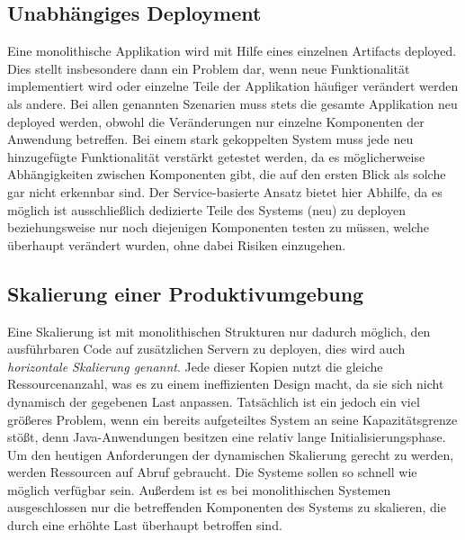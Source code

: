 \subsection{Unabhängiges Deployment}
Eine monolithische Applikation wird mit Hilfe eines einzelnen Artifacts deployed. Dies stellt insbesondere dann ein Problem dar, wenn neue Funktionalität implementiert wird oder einzelne Teile der Applikation häufiger verändert werden als andere. Bei allen genannten Szenarien muss stets die gesamte Applikation neu deployed werden, obwohl die Veränderungen nur einzelne Komponenten der Anwendung betreffen. Bei einem stark gekoppelten System muss jede neu hinzugefügte Funktionalität verstärkt getestet werden, da es möglicherweise Abhängigkeiten zwischen Komponenten gibt, die auf den ersten Blick als solche gar nicht erkennbar sind. Der Service-basierte Ansatz bietet hier Abhilfe, da es möglich ist ausschließlich dedizierte Teile des Systems (neu) zu deployen beziehungsweise nur noch diejenigen Komponenten testen zu müssen, welche überhaupt verändert wurden, ohne dabei Risiken einzugehen. 


\subsection{Skalierung einer Produktivumgebung}
Eine Skalierung ist mit monolithischen Strukturen nur dadurch möglich, den ausführbaren Code auf zusätzlichen Servern zu deployen, dies wird auch \emph{horizontale Skalierung genannt}. Jede dieser Kopien nutzt die gleiche Ressourcenanzahl, was es zu einem ineffizienten Design macht, da sie sich nicht dynamisch der gegebenen Last anpassen. Tatsächlich ist ein jedoch ein viel größeres Problem, wenn ein bereits aufgeteiltes System an seine Kapazitätsgrenze stößt, denn Java-Anwendungen besitzen eine relativ lange Initialisierungsphase. Um den heutigen Anforderungen der dynamischen Skalierung gerecht zu werden, werden Ressourcen auf Abruf gebraucht. Die Systeme sollen so schnell wie möglich verfügbar sein. Außerdem ist es bei monolithischen Systemen ausgeschlossen nur die betreffenden Komponenten des Systems zu skalieren, die durch eine erhöhte Last überhaupt betroffen sind.


